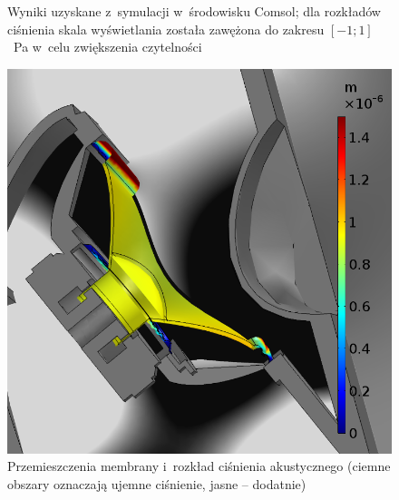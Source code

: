 \documentclass[12pt]{oska}
\begin{document}
\begin{figure}[!ht]
			\caption{Wyniki uzyskane z~symulacji w~środowisku Comsol; dla rozkładów ciśnienia skala wyświetlania została zawężona do zakresu $[-1;1]$~\si{\pascal} w~celu zwiększenia czytelności}
			\label{r:C_rozklady}
		\end{figure}
		
		\begin{figure}[!ht]
			\centering
			\includegraphics[width=.6\textwidth]{disp_presure_1kHz.png}
			\caption{Przemieszczenia membrany i~rozkład ciśnienia akustycznego (ciemne obszary oznaczają ujemne ciśnienie, jasne -- dodatnie)}
			\label{r:C_przem_cisn}
		\end{figure}
		
\end{document}
